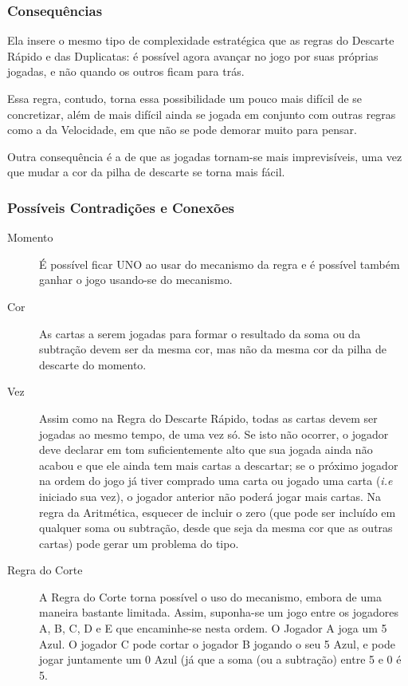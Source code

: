 \subsubsection{Consequências}

Ela insere o mesmo tipo de complexidade estratégica que as regras do Descarte Rápido e das Duplicatas: é possível agora avançar no jogo por suas próprias jogadas, e não quando os outros ficam para trás.

Essa regra, contudo, torna essa possibilidade um pouco mais difícil de se concretizar, além de mais difícil ainda se jogada em conjunto com outras regras como a da Velocidade, em que não se pode demorar muito para pensar.

Outra consequência é a de que as jogadas tornam-se mais imprevisíveis, uma vez que mudar a cor da pilha de descarte se torna mais fácil.

\subsubsection{Possíveis Contradições e Conexões}

\begin{description}
\item[Momento]{É possível ficar UNO ao usar do mecanismo da regra e é possível também ganhar o jogo usando-se do mecanismo.}
\item[Cor]{As cartas a serem jogadas para formar o resultado da soma ou da subtração devem ser da mesma cor, mas não da mesma cor da pilha de descarte do momento.}
\item[Vez]{Assim como na Regra do Descarte Rápido, todas as cartas devem ser jogadas ao mesmo tempo, de uma vez só. Se isto não ocorrer, o jogador deve declarar em tom suficientemente alto que sua jogada ainda não acabou e que ele ainda tem mais cartas a descartar; se o próximo jogador na ordem do jogo já tiver comprado uma carta ou jogado uma carta (\emph{i.e} iniciado sua vez), o jogador anterior não poderá jogar mais cartas. Na regra da Aritmética, esquecer de incluir o zero (que pode ser incluído em qualquer soma ou subtração, desde que seja da mesma cor que as outras cartas) pode gerar um problema do tipo.}
\item[Regra do Corte]{A Regra do Corte torna possível o uso do mecanismo, embora de uma maneira bastante limitada. Assim, suponha-se um jogo entre os jogadores A, B, C, D e E que encaminhe-se nesta ordem. O Jogador A joga um 5 Azul. O jogador C pode cortar o jogador B jogando o seu 5 Azul, e pode jogar juntamente um 0 Azul (já que a soma (ou a subtração) entre 5 e 0 é 5.}
\end{description}

